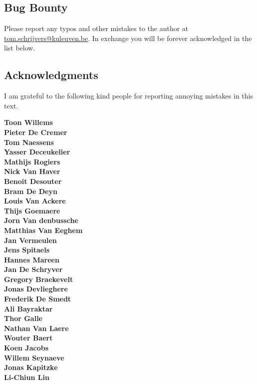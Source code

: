 \subsection*{Bug Bounty}

Please report any typos and other mistakes to the author at \url{tom.schrijvers@kuleuven.be}.
In exchange you will be forever acknowledged in the list below.

\subsection*{Acknowledgments}

I am grateful to the following kind people
for reporting annoying mistakes in this text.

\noindent\begin{multicols}{2}
\noindent\textbf{Toon Willems}\\ 
\textbf{Pieter De Cremer}\\ 
\textbf{Tom Naessens}\\ 
\textbf{Yasser Deceukelier}\\
\textbf{Mathijs Rogiers}\\
\textbf{Nick Van Haver}\\
\textbf{Benoit Desouter}\\
\textbf{Bram De Deyn}\\
\textbf{Louis Van Ackere}\\
\textbf{Thijs Goemaere}\\
\textbf{Jorn Van denbussche}\\
\textbf{Matthias Van Eeghem}\\
\textbf{Jan Vermeulen}\\
\textbf{Jens Spitaels}\\
\textbf{Hannes Mareen}\\
\textbf{Jan De Schryver}\\
\textbf{Gregory Braekevelt}\\
\textbf{Jonas Devlieghere}\\
\textbf{Frederik De Smedt}\\
\textbf{Ali Bayraktar}\\
\textbf{Thor Galle}\\
\textbf{Nathan Van Laere}\\
\textbf{Wouter Baert}\\
\textbf{Koen Jacobs}\\
\textbf{Willem Seynaeve}\\
\textbf{Jonas Kapitzke}\\
\textbf{Li-Chiun Lin}\\

\end{multicols}
